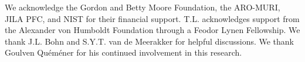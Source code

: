 \documentclass[%
 reprint,
 amsmath,amssymb,
 aps,
prl,
]{revtex4-1}
\begin{document}
We acknowledge the Gordon and Betty Moore Foundation, the ARO-MURI, JILA PFC, and NIST for their financial support. T.L. acknowledges support from the Alexander von Humboldt Foundation through a Feodor Lynen Fellowship. We thank J.L. Bohn and S.Y.T. van de Meerakker for helpful discussions. We thank Goulven Qu\'em\'ener for his continued involvement in this research.


%
\end{document}
